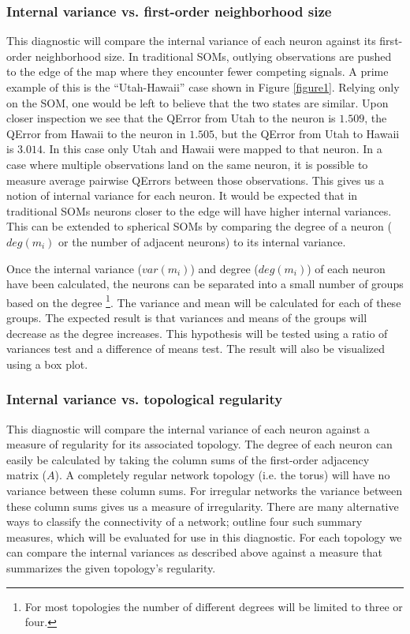 \documentclass[10pt,titlepage]{article}
\begin{document}
\subsubsection{Internal variance vs. first-order neighborhood size}
This diagnostic will compare the internal variance of each neuron against its
first-order neighborhood size.  In traditional SOMs, outlying observations are
pushed to the edge of the map where they encounter fewer competing signals. A
prime example of this is the ``Utah-Hawaii'' case shown in Figure
\ref{figure1}.  Relying only on the SOM, one would be left to believe that the
two states are similar. Upon closer inspection we see that the QError from
Utah to the neuron is $1.509$, the QError from Hawaii to the neuron in
$1.505$, but the QError from Utah to Hawaii is $3.014$. In this case only Utah
and Hawaii were mapped to that neuron.  In a case where multiple observations
land on the same neuron, it is possible to measure average pairwise QErrors
between those observations.  This gives us a notion of internal variance for
each neuron. It would be expected that in traditional SOMs neurons closer to
the edge will have higher internal variances. This can be extended to
spherical SOMs by comparing the degree of a neuron ($deg(m_i)$ or the number of
adjacent neurons) to its internal variance.

Once the internal variance ($var(m_i)$) and degree ($deg(m_i)$) of each neuron
have been calculated, the neurons can be separated into a small number of
groups based on the degree \footnote{For most topologies the number of
different degrees will be limited to three or four.}.  The variance and mean
will be calculated for each of these groups.  The expected result is that
variances and means of the groups will decrease as the degree increases.  This
hypothesis will be tested using a ratio of variances test and a difference of
means test.  The result will also be visualized using a box plot.

\subsubsection{Internal variance vs. topological regularity}
This diagnostic will compare the internal variance of each neuron against a
measure of regularity for its associated topology.  The degree of each neuron
can easily be calculated by taking the column sums of the first-order
adjacency matrix ($A$).  A completely regular network topology (i.e. the
torus) will have no variance between these column sums.  For irregular
networks the variance between these column sums gives us a measure of
irregularity. There are many alternative ways to classify the connectivity of
a network; \cite{florax95} outline four such summary measures, which will be
evaluated for use in this diagnostic.  For each topology we can compare the
internal variances as described above against a measure that summarizes the
given topology's regularity.
\end{document}

